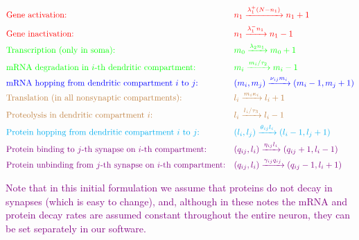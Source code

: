\documentclass[a4paper, 11pt]{article}
\begin{document}
\begin{align*}
  &\textcolor{red}{\text{Gene activation:}} \quad &&\textcolor{red}{n_1 \xrightarrow[]{\lambda_1^+(N-n_1)} n_1+1}\\
  &\textcolor{red}{\text{Gene inactivation:}}  &&\textcolor{red}{n_1 \xrightarrow[]{\lambda_1^-n_1} n_1-1}\\
  &\textcolor{green}{\text{Transcription (only in soma):}} &&\textcolor{green}{m_0 \xrightarrow[]{\lambda_2n_1} m_0+1}\\
  &\textcolor{green}{\text{mRNA degradation in $i$-th dendritic compartment:}} &&\textcolor{green}{m_i \xrightarrow[]{m_i/\tau_2} m_i-1}\\
  &\textcolor{blue}{\text{mRNA hopping from dendritic compartment $i$ to $j$:}} &&\textcolor{blue}{(m_i, m_j) \xrightarrow[]{\nu_{ij}m_i} (m_i-1, m_j+1)}\\
  &\textcolor{brown}{\text{Translation (in all nonsynaptic compartments):}} &&\textcolor{brown}{l_i \xrightarrow[]{m_i\kappa_i} l_i+1}\\
  &\textcolor{brown}{\text{Proteolysis in dendritic compartment $i$:}} &&\textcolor{brown}{l_i \xrightarrow[]{l_i/\tau_3} l_i-1}\\
  &\textcolor{cyan}{\text{Protein hopping from dendritic compartment $i$ to $j$:}} &&\textcolor{cyan}{(l_i, l_j) \xrightarrow[]{\theta_{ij}l_i} (l_i-1, l_j+1)}\\
  &\textcolor{violet}{\text{Protein binding to $j$-th synapse on $i$-th compartment:}} &&\textcolor{violet}{(q_{ij}, l_i) \xrightarrow[]{\eta_{ij}l_i} (q_{ij}+1, l_i-1)}\\
  &\textcolor{violet}{\text{Protein unbinding from $j$-th synapse on $i$-th compartment:}} &&\textcolor{violet}{(q_{ij}, l_i) \xrightarrow[]{\gamma_{ij}q_{ij}} (q_{ij}-1, l_i+1)}
\end{align*}

\textcolor{purple}{Note that in this initial formulation we assume that proteins do not decay in synapses (which is easy to change), and, although in these notes the mRNA and protein decay rates are assumed constant throughout the entire neuron, they can be set separately in our software.}%
  
\end{document}
